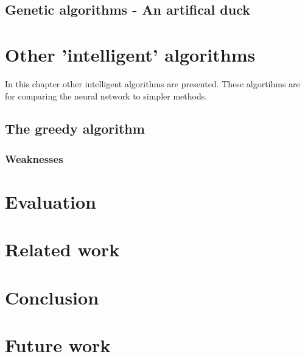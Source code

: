 \documentclass[10pt,a4paper,DIV=11]{scrreprt}
\begin{document}
\section{Genetic algorithms - An artifical duck}

\section{}

\chapter{Other 'intelligent' algorithms}
In this chapter other intelligent algorithms are presented.
These algortihms are for comparing the neural network to simpler
methods.

\section{The greedy algorithm}

\subsection{Weaknesses}

\chapter{Evaluation}
\chapter{Related work}
\chapter{Conclusion}
\chapter{Future work}





\newpage


\listoffigures
\listoftables
\listofalgorithms
\lstlistoflistings

\newpage




\end{document}
